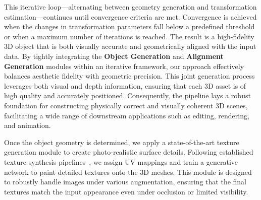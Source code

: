 \medskip
This iterative loop—alternating between geometry generation and transformation estimation—continues until convergence criteria are met. Convergence is achieved when the changes in transformation parameters fall below a predefined threshold or when a maximum number of iterations is reached. The result is a high-fidelity 3D object that is both visually accurate and geometrically aligned with the input data.
%
By tightly integrating the \textbf{Object Generation} and \textbf{Alignment Generation} modules within an iterative framework, our approach effectively balances aesthetic fidelity with geometric precision. This joint generation process leverages both visual and depth information, ensuring that each 3D asset is of high quality and accurately positioned. Consequently, the pipeline lays a robust foundation for constructing physically correct and visually coherent 3D scenes, facilitating a wide range of downstream applications such as editing, rendering, and animation.

Once the object geometry is determined, we apply a state-of-the-art texture generation module to create photo-realistic surface details. Following established texture synthesis pipelines~\cite{zhang20233dshape2vecset,zhang2024clay}, we assign UV mappings and train a generative network to paint detailed textures onto the 3D meshes. This module is designed to robustly handle images under various augmentation, ensuring that the final textures match the input appearance even under occlusion or limited visibility.





